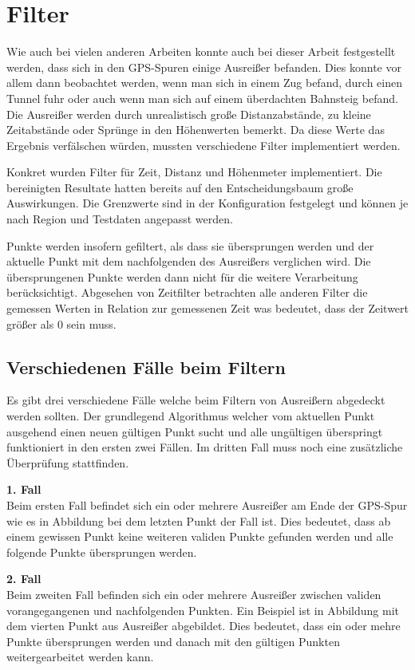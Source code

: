 \chapter{Filter}
Wie auch bei vielen anderen Arbeiten konnte auch bei dieser Arbeit festgestellt werden, dass sich in den GPS-Spuren einige Ausreißer befanden. Dies konnte vor allem dann beobachtet werden, wenn man sich in einem Zug befand, durch einen Tunnel fuhr oder auch wenn man sich auf einem überdachten Bahnsteig befand. Die Ausreißer werden durch unrealistisch große Distanzabstände, zu kleine Zeitabstände oder Sprünge in den Höhenwerten bemerkt. Da diese Werte das Ergebnis verfälschen würden, mussten verschiedene Filter implementiert werden. 

Konkret wurden Filter für Zeit, Distanz und Höhenmeter implementiert. Die bereinigten Resultate hatten bereits auf den Entscheidungsbaum große Auswirkungen. Die Grenzwerte sind in der Konfiguration festgelegt und können je nach Region und Testdaten angepasst werden.

Punkte werden insofern gefiltert, als dass sie übersprungen werden und der aktuelle Punkt mit dem nachfolgenden des Ausreißers verglichen wird. Die übersprungenen Punkte werden dann nicht für die weitere Verarbeitung berücksichtigt. Abgesehen von Zeitfilter betrachten alle anderen Filter die gemessen Werten in Relation zur gemessenen Zeit was bedeutet, dass der Zeitwert größer als 0 sein muss.

\section{Verschiedenen Fälle beim Filtern}
Es gibt drei verschiedene Fälle welche beim Filtern von Ausreißern abgedeckt werden sollten. Der grundlegend Algorithmus welcher vom aktuellen Punkt ausgehend einen neuen gültigen Punkt sucht und alle ungültigen überspringt funktioniert in den ersten zwei Fällen. Im dritten Fall muss noch eine zusätzliche Überprüfung stattfinden.

\textbf{1. Fall}\\
Beim ersten Fall befindet sich ein oder mehrere Ausreißer am Ende der GPS-Spur wie es in Abbildung  bei dem letzten Punkt der Fall ist. Dies bedeutet, dass ab einem gewissen Punkt keine weiteren validen Punkte gefunden werden und alle folgende Punkte übersprungen werden.


\textbf{2. Fall}\\
Beim zweiten Fall befinden sich ein oder mehrere Ausreißer zwischen validen vorangegangenen und nachfolgenden Punkten. Ein Beispiel ist in Abbildung  mit dem vierten Punkt aus Ausreißer abgebildet. Dies bedeutet, dass ein oder mehre Punkte übersprungen werden und danach mit den gültigen Punkten weitergearbeitet werden kann.

